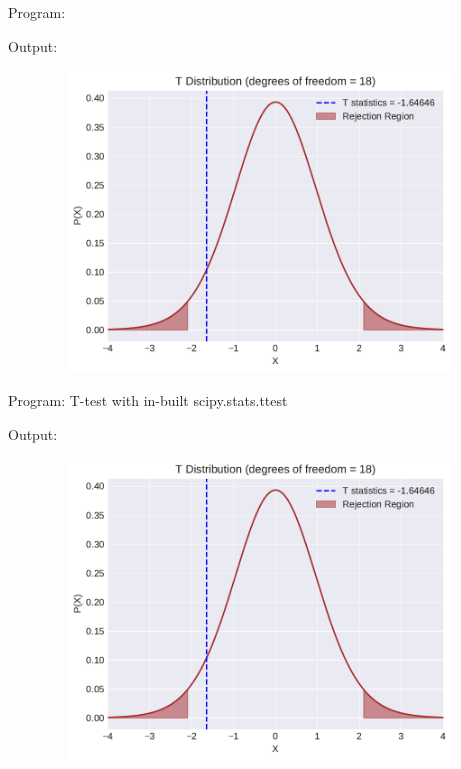 \documentclass[a4paper,11pt,openright]{report}
\begin{document}
\begin{enumerate}
\vspace{3cm}

Program:


\vspace{2cm}

Output:


\begin{figure}[ht!]
\includegraphics[width=16cm,height=8cm,keepaspectratio]{tscript3.pdf}
\centering
\end{figure}

\vspace{2cm}

Program: T-test with in-built scipy.stats.ttest


\vspace{2cm}

Output:


\begin{figure}[ht!]
\includegraphics[width=16cm,height=8cm,keepaspectratio]{ttest2.pdf}
\centering
\end{figure}


\end{enumerate}
\end{document}

